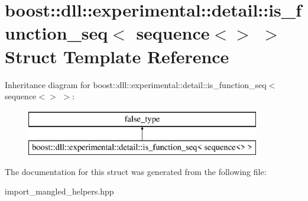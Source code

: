 \hypertarget{a00172}{}\section{boost\+:\+:dll\+:\+:experimental\+:\+:detail\+:\+:is\+\_\+function\+\_\+seq$<$ sequence$<$$>$ $>$ Struct Template Reference}
\label{a00172}
Inheritance diagram for boost\+:\+:dll\+:\+:experimental\+:\+:detail\+:\+:is\+\_\+function\+\_\+seq$<$ sequence$<$$>$ $>$\+:\begin{figure}[H]
\begin{center}
\leavevmode
\includegraphics[height=2.000000cm]{a00172}
\end{center}
\end{figure}


The documentation for this struct was generated from the following file\+:\begin{DoxyCompactItemize}
\item 
import\+\_\+mangled\+\_\+helpers.\+hpp\end{DoxyCompactItemize}
